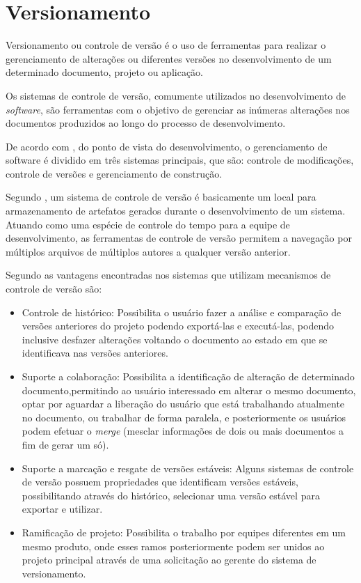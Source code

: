 \section{Versionamento}

Versionamento ou controle de versão é o uso de ferramentas para realizar o gerenciamento de alterações ou diferentes versões no desenvolvimento de um determinado documento, projeto ou aplicação.

Os sistemas de controle de versão, comumente utilizados no desenvolvimento de \textit{software}, são ferramentas com o objetivo de gerenciar as inúmeras alterações nos documentos produzidos ao longo do processo de desenvolvimento.

De acordo com \cite{murta2006gerencia}, do ponto de vista do desenvolvimento, o gerenciamento de software é dividido em três sistemas principais, que são: controle de modificações, controle de versões e gerenciamento de construção.

Segundo \cite{mason2006pragmatic}, um sistema de controle de versão é basicamente um local para armazenamento de artefatos gerados durante o desenvolvimento de um sistema. Atuando como uma espécie de controle do tempo para a equipe de desenvolvimento, as ferramentas de controle de versão permitem a navegação por múltiplos arquivos de múltiplos autores a qualquer versão anterior.

Segundo  as vantagens encontradas nos sistemas que utilizam mecanismos de controle de versão são: 
 \begin{itemize}
     \item Controle de histórico: Possibilita o usuário fazer a análise e comparação de versões anteriores do projeto podendo exportá-las e executá-las, podendo inclusive desfazer alterações voltando o documento ao estado em que se identificava nas versões anteriores.
     \item Suporte a colaboração: Possibilita a identificação de alteração de determinado documento,permitindo ao usuário interessado em alterar o mesmo documento, optar por aguardar a liberação do usuário que está trabalhando atualmente no documento, ou trabalhar de forma paralela, e posteriormente os usuários podem efetuar o \textit{merge} (mesclar informações de dois ou mais documentos a fim de gerar um só).
    \item Suporte a marcação e resgate de versões estáveis: Alguns sistemas de controle de versão possuem propriedades que identificam versões estáveis, possibilitando através do histórico, selecionar uma versão estável para exportar e utilizar.
    \item Ramificação de projeto: Possibilita o trabalho por equipes diferentes em um mesmo produto, onde esses ramos posteriormente podem ser unidos ao projeto principal através de uma solicitação ao gerente do sistema de versionamento.
 \end{itemize}

